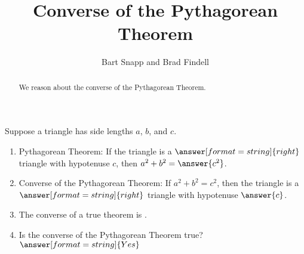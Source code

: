 \documentclass[nooutcomes,noauthor]{ximera}
\title{Converse of the Pythagorean Theorem}
\author{Bart Snapp and Brad Findell}
\begin{document}
\begin{abstract}
  We reason about the converse of the Pythagorean Theorem.
\end{abstract}
\maketitle


\begin{problem}

Suppose a triangle has side lengths $a$, $b$, and $c$.  
\begin{enumerate}
\item Pythagorean Theorem: If the triangle is a $\answer[format=string]{right}$ triangle with hypotenuse $c$, then $a^2+b^2=\answer{c^2}$.  

\item Converse of the Pythagorean Theorem:  If $a^2+b^2=c^2$, then the triangle is a $\answer[format=string]{right}$ triangle with hypotenuse $\answer{c}$.  

\item The converse of a true theorem is .  

\item Is the converse of the Pythagorean Theorem true?  $\answer[format=string]{Yes}$
\end{enumerate}
\end{problem}
\end{document}
